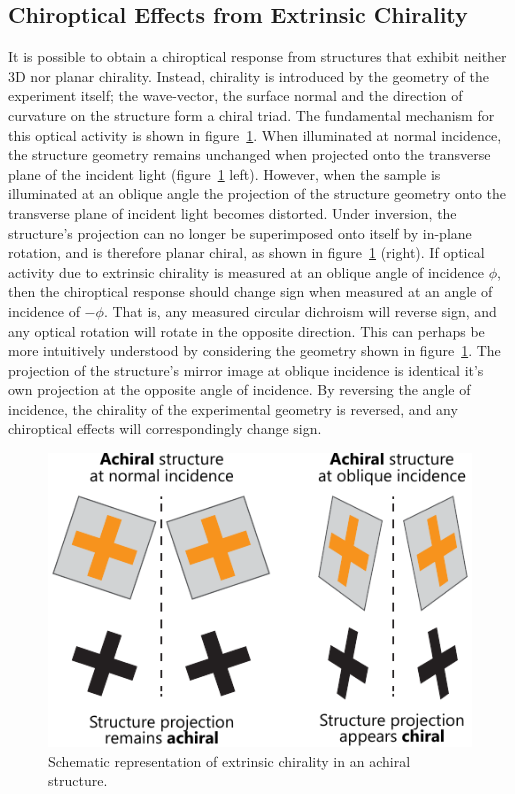 \subsection{Chiroptical Effects from Extrinsic Chirality}\label{sec:background:Chirality:extrinsic}
It is possible to obtain a chiroptical response from structures that exhibit neither 3D nor planar chirality. Instead, chirality is introduced by the geometry of the experiment itself; the wave-vector, the surface normal and the direction of curvature on the structure form a chiral triad. 
The fundamental mechanism for this optical activity is shown in figure~\ref{fig:background:Chirality:extrinsic}. When illuminated at normal incidence, the structure geometry remains unchanged when projected onto the transverse plane of the incident light (figure~\ref{fig:background:Chirality:extrinsic} left). However, when the sample is illuminated at an oblique angle the projection of the structure geometry onto the transverse plane of incident light becomes distorted. Under inversion, the structure's projection can no longer be superimposed onto itself by in-plane rotation, and is therefore planar chiral, as shown in figure~\ref{fig:background:Chirality:extrinsic} (right). 
If optical activity due to extrinsic chirality is measured at an oblique angle of incidence $\phi$, then the chiroptical response should change sign when measured at an angle of incidence of $-\phi$. That is, any measured circular dichroism will reverse sign, and any optical rotation will rotate in the opposite direction. This can perhaps be more intuitively understood by considering the geometry shown in figure~\ref{fig:background:Chirality:extrinsic}. The projection of the structure's mirror image at oblique incidence is identical it's own projection at the opposite angle of incidence. By reversing the angle of incidence, the chirality of the experimental geometry is reversed, and any chiroptical effects will correspondingly change sign.
\begin{figure}[htb!]
    \centering
    \includegraphics[scale=1.0]{./figures/background/chiroptics/extrinsic_chirality.pdf}
    \caption{\label{fig:background:Chirality:extrinsic}Schematic representation of extrinsic chirality in an achiral structure.}
\end{figure}
